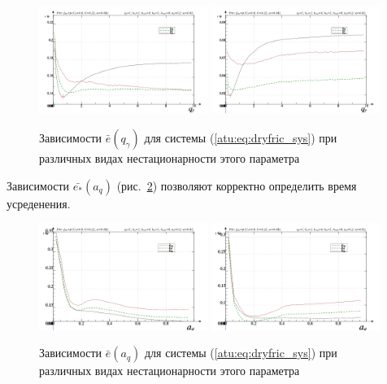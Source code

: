 \documentclass[a4paper,12pt]{article}
\begin{document}
\begin{figure}[htb!]
\centerline{
  \includegraphics[width=0.49\textwidth]{p/cha/fric/fric_m5p-p_qg_e_sign.png}
  \includegraphics[width=0.49\textwidth]{p/cha/fric/fric_m5p-p_qg_e_sin.png}
}
  \caption{Зависимости  $\bar{e}(q_\gamma)$ для системы (\ref{atu:eq:dryfric_sys})
  при различных видах нестационарности этого параметра
}
\label{atu:f:fric_e_qgamma}
\end{figure}


Зависимости $\bar{e_*}(a_q)$ (рис.~\ref{atu:f:fric_e_a_q})
 позволяют корректно определить время усреденения.

\begin{figure}[htb!]
\centerline{
  \includegraphics[width=0.49\textwidth]{p/cha/fric/fric_m5p-p_a_q_e_sign.png}
  \includegraphics[width=0.49\textwidth]{p/cha/fric/fric_m5p-p_a_q_e_sin.png}
}
  \caption{Зависимости  $\bar{e}(a_q)$ для системы (\ref{atu:eq:dryfric_sys})
  при различных видах нестационарности этого параметра
}
\label{atu:f:fric_e_a_q}
\end{figure}
\end{document}
